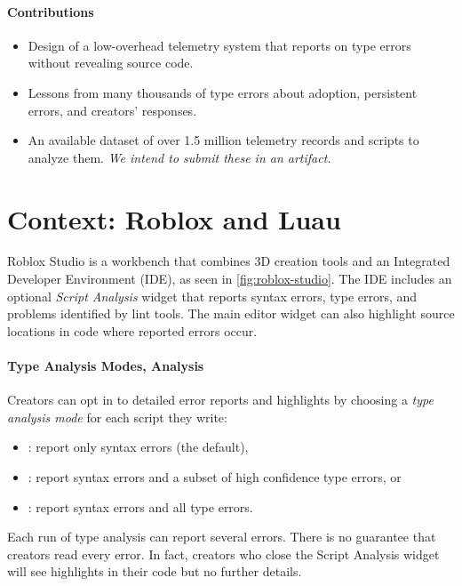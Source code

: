 \documentclass[english,submission,cleveref]{programming}
\begin{document}
\paragraph{Contributions}
\begin{itemize}
  \item
    Design of a low-overhead telemetry system
    that reports on type errors without revealing source code.

  \item
    Lessons from many thousands of type errors about
    adoption, persistent errors, and creators' responses.

  \item
    An available dataset of over 1.5 million telemetry records
    and scripts to analyze them.
    \emph{We intend to submit these in an artifact.}

\end{itemize}


\section{Context: {Roblox} and {Luau}}
\label{s:context}



{Roblox Studio} is a workbench that
combines {3D creation} tools and an Integrated
Developer Environment (IDE), as seen in \cref{fig:roblox-studio}.
The IDE includes an optional \emph{Script Analysis} widget that
reports syntax errors, type errors, and problems identified by
lint tools. The main editor widget can also highlight
source locations in code where reported errors occur.


\paragraph{Type Analysis Modes, \FS{} Analysis}

Creators can opt in to detailed error reports and highlights by
choosing a \emph{type analysis mode} for each script they write:
\begin{itemize}
  \item \mnocheck{}: report only syntax errors (the default),
  \item \mnonstrict{}: report syntax errors and a subset of high confidence type errors, or
  \item \mstrict{}: report syntax errors and all type errors.
\end{itemize}
Each run of type analysis can report several errors.
There is no guarantee that creators read every error.
In fact, creators who close the Script Analysis widget
will see highlights in their code but no further details.
\end{document}
